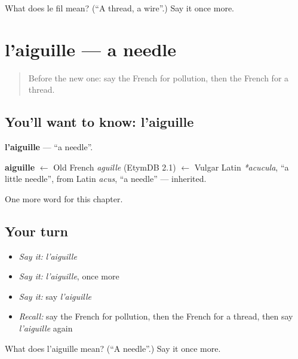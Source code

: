 \begin{tcolorbox}[breakable,colback=teal!4,colframe=teal!35!black,title={Before you move on}]
What does le fil mean? (\textquotedblleft{}A thread, a wire\textquotedblright{}.) Say it once more.
\end{tcolorbox}
\section[l'aiguille]{l'aiguille — a needle}

\label{lesson:FR-C230-aiguille}



\begin{quote}
Before the new one: say the French for pollution, then the French for a thread.
\end{quote}

\subsection*{You'll want to know: l'aiguille}
\textbf{l'aiguille} — \textquotedblleft{}a needle\textquotedblright{}.

\begin{cousinweb}
\textbf{aiguille} $\leftarrow$ Old French \emph{aguille} (EtymDB 2.1) $\leftarrow$ Vulgar Latin \emph{*acucula}, \textquotedblleft{}a little needle\textquotedblright{}, from Latin \emph{acus}, \textquotedblleft{}a needle\textquotedblright{} — inherited.
\end{cousinweb}

\begin{grammarlens}[title={What you've built}]
One more word for this chapter.
\end{grammarlens}

\subsection*{Your turn}
\begin{itemize}
\raggedright
  \item \emph{Say it:} \emph{l'aiguille}
  \item \emph{Say it:} \emph{l'aiguille}, once more
  \item \emph{Say it:} say \emph{l'aiguille}
  \item \emph{Recall:} say the French for pollution, then the French for a thread, then say \emph{l'aiguille} again
\end{itemize}

\begin{tcolorbox}[breakable,colback=teal!4,colframe=teal!35!black,title={Before you move on}]
What does l'aiguille mean? (\textquotedblleft{}A needle\textquotedblright{}.) Say it once more.
\end{tcolorbox}
